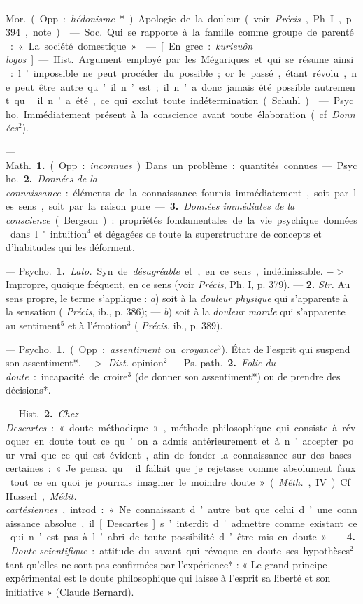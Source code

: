 \begin{itemize}[leftmargin=1cm, label=, itemsep=1pt]
 — \si{Mor.} (Opp. : {\it hédonisme}*).
Apologie de la douleur (voir  {\it Précis},
Ph. I, p. 394, note).

 — \si{Soc.} Qui se rapporte à
la famille comme groupe de parenté :
« La société domestique ».

 — [En grec : {\it kurieuôn logos}] — \si{Hist.}
Argument employé par les Mégariques et qui se résume ainsi : l’impossible ne
peut procéder du possible ; or le passé, étant révolu, ne peut être autre
qu’il n’est ; il n’a donc jamais été possible autrement qu'il n'a été, ce qui
exclut toute indétermination (Schuhl).

 — \si{Psycho.} Immédiatement
présent à la conscience avant toute
élaboration (cf. {\it Données}$^2$).

 — \si{Math.} {\bf 1.} (Opp. : {\it inconnues}).
Dans un problème : quantités connues.

— \si{Psycho.} {\bf 2.} {\it Données de la connaissance} :
éléments de la connaissance fournis immédiatement, soit
par les sens, soit par la raison pure.
— {\bf 3.} {\it Données immédiates de la conscience} (Bergson) :
propriétés fondamentales de la vie psychique données dans l'intuition$^4$
et dégagées de toute la superstructure de concepts
et d’habitudes qui les déforment.

 — \si{Psycho.} {\bf 1.} {\it Lato.} Syn. de
{\it désagréable} et, en ce sens, indéfinissable. $->$ Impropre, quoique fréquent, en ce sens (voir  {\it Précis}, Ph. I,
p. 379). — {\bf 2.} {\it Str.} Au sens propre,
le terme s’applique : {\it a}) soit à la {\it douleur physique} qui s'apparente à la
sensation ( {\it Précis}, ib., p. 386); —
{\it b}) soit à la {\it douleur morale} qui s’apparente au sentiment$^5$ et à l’émotion$^3$
( {\it Précis}, ib., p. 389).

 — \si{Psycho.} {\bf 1.} (Opp. :
{\it assentiment} ou {\it croyance}$^3$). État de l'esprit
qui suspend son assentiment*.
$->$ {\it Dist.} opinion$^2$ — \si{Ps. path.}
 {\bf 2.} {\it Folie du doute} : incapacité de
croire$^3$ (de donner son assentiment*)
ou de prendre des décisions*.

— \si{Hist.} {\bf 2.} {\it Chez Descartes} : « doute
méthodique », méthode philosophique qui consiste à révoquer en
doute tout ce qu’on a admis antérieurement et à n’accepter pour vrai
que ce qui est évident, afin de fonder
la connaissance sur des bases certaines : « Je pensai qu'il fallait que
je rejetasse comme absolument faux
tout ce en quoi je pourrais imaginer
le moindre doute » ({\it Méth.}, IV). Cf.
Husserl, {\it Médit. cartésiennes}, introd. :
« Ne connaissant d’autre but que
celui d’une connaissance absolue,
il [Descartes] s’interdit d'admettre
comme existant ce qui n’est pas à
l’abri de toute possibilité d’être mis
en doute ». — {\bf 4.} {\it Doute scientifique} :
attitude du savant qui révoque en
doute ses hypothèses$^2$ tant qu’elles
ne sont pas confirmées par l’expérience* : « Le grand principe expérimental est le doute philosophique
qui laisse à l’esprit sa liberté et son
initiative » (Claude Bernard).


\end{itemize}
